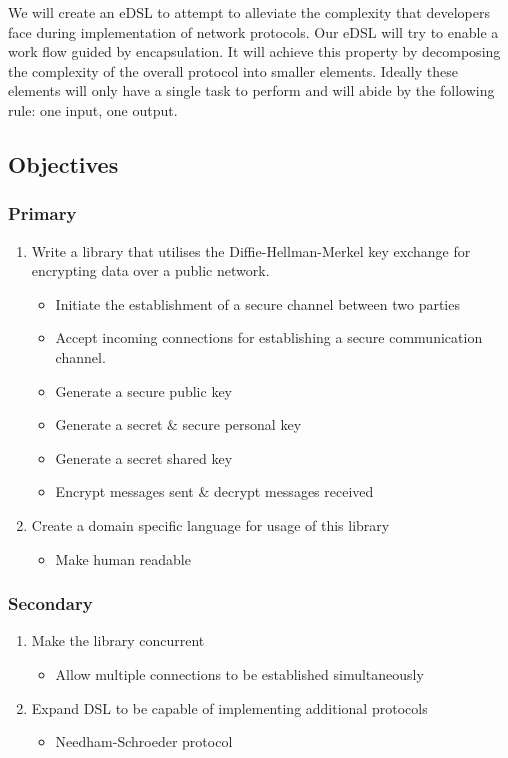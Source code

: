 We will create an eDSL to attempt to alleviate the complexity that developers face during implementation of network protocols. Our eDSL will try to enable a work flow guided by encapsulation. It will achieve this property by decomposing the complexity of the overall protocol into smaller elements. Ideally these elements will only have a single task to perform and will abide by the following rule: one input, one output. 



\subsection{Objectives}
\label{sec:objectives}
\subsubsection{Primary}
\begin{enumerate}
    \item Write a library that utilises the Diffie-Hellman-Merkel key exchange for encrypting data 
over a public network.
        \begin{itemize}
            \item Initiate the establishment of a secure channel between two parties 
            \item Accept incoming connections for establishing a secure communication channel. 
            \item Generate a secure public key 
            \item Generate a secret \& secure personal key 
            \item Generate a secret shared key 
            \item Encrypt messages sent \& decrypt messages received
        \end{itemize}
    \item Create a domain specific language for usage of this library
        \begin{itemize}
            \item Make human readable
        \end{itemize}
\end{enumerate}
\subsubsection{Secondary}
\begin{enumerate}
    \item Make the library concurrent
        \begin{itemize}
            \item Allow multiple connections to be established simultaneously
        \end{itemize}
    \item Expand DSL to be capable of implementing additional protocols
        \begin{itemize}
            \item Needham-Schroeder protocol 
        \end{itemize}
\end{enumerate}

